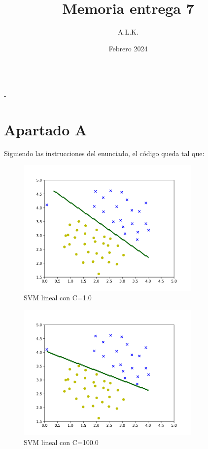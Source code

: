 \documentclass[6pt]{../../shared/AiTex}
\title{Memoria entrega 7}
\author{A.L.K.}
\date{Febrero 2024}
\begin{document}
\justify

\begin{center}

    {\huge \textbf{\underline{\subtitulo}}} \\
    { \lesson - \autor}

\end{center}

\section{Apartado A}
Siguiendo las instrucciones  del enunciado,  el código queda tal que:



\begin{figure}[H]
    \centering
    \includegraphics[width=0.8\textwidth]{./images/SVM_lineal_c1.0.png}
    \caption{SVM lineal con C=1.0}
\end{figure}

\begin{figure}[H]
    \centering
    \includegraphics[width=0.8\textwidth]{./images/SVM_lineal_c100.0.png}
    \caption{SVM lineal con C=100.0}
\end{figure}
\end{document}
